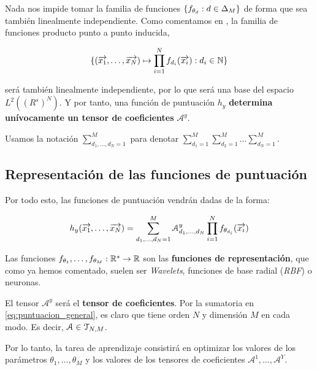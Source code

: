 \begin{observacion}

	Nada nos impide tomar la familia de funciones $\{f_{\theta_d}: d \in \Delta_{M}\}$ de forma que sea también linealmente independiente. Como comentamos en , la familia de funciones producto punto a punto inducida,

	\begin{equation}
		\{ (\overrightarrow{x_1}, \ldots, \overrightarrow{x_N}) \mapsto \prod_{i = 1}^N f_{d_i}(\overrightarrow{x_i}): d_i \in \mathbb{N} \}
	\end{equation}

	será también linealmente independiente, por lo que será una base del espacio $L^2((R^s)^N)$. Y por tanto, una función de puntuación $h_y$ \textbf{determina unívocamente un tensor de coeficientes} $\mathcal{A}^y$.

\end{observacion}

\begin{observacion}
	Usamos la notación $\sum_{d_1, \ldots, d_N = 1}^{M}$ para denotar $\sum_{d_1 = 1}^{M} \sum_{d_2 = 1}^{M} \ldots \sum_{d_N = 1}^{M}$.
\end{observacion}

\subsection{Representación de las funciones de puntuación} \label{sec:repr_funciones_puntuacion}

Por todo esto, las funciones de puntuación vendrán dadas de la forma:

\begin{equation} \label{eq:puntuacion_general}
	h_y(\overrightarrow{x_1}, \ldots, \overrightarrow{x_N}) = \sum_{d_1, \ldots, d_N = 1}^{M} \mathcal{A}^y_{d_1, \ldots, d_N} \prod_{i = 1}^N f_{\theta_{d_i}}(\overrightarrow{x_i})
\end{equation}

Las funciones $f_{\theta_1}, \ldots, f_{\theta_M}: \mathbb{R}^s \to \mathbb{R}$ son las \textbf{funciones de representación}, que como ya hemos comentado, suelen ser \textit{Wavelets}, funciones de base radial (\textit{RBF}) o neuronas.

El tensor $\mathcal{A}^y$ será el \textbf{tensor de coeficientes}. Por la sumatoria en \eqref{eq:puntuacion_general}, es claro que tiene orden $N$ y dimensión $M$ en cada modo. Es decir, $\mathcal{A} \in \mathcal{T}_{N, M}$.

Por lo tanto, la tarea de aprendizaje consistirá en optimizar los valores de los parámetros $\theta_1, \ldots, \theta_M$ y los valores de los tensores de coeficientes $\mathcal{A}^1, \ldots, \mathcal{A}^Y$.

